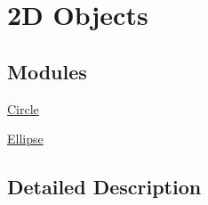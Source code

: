 \hypertarget{group___e_g_x_math-_geometry-2_d}{}\section{2D Objects}
\label{group___e_g_x_math-_geometry-2_d}
\subsection*{Modules}
\begin{DoxyCompactItemize}
\item 
\mbox{\hyperlink{group___e_g_x_math-_geometry-2_d-_circle}{Circle}}
\item 
\mbox{\hyperlink{group___e_g_x_math-_geometry-2_d-_ellipse}{Ellipse}}
\end{DoxyCompactItemize}


\subsection{Detailed Description}
